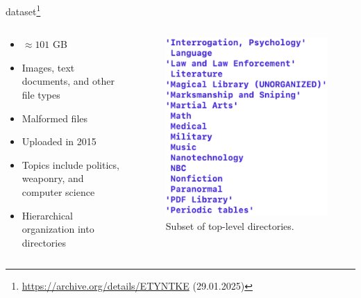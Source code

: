 \begin{frame}{\ac{dataset}\footnote{\url{https://archive.org/details/ETYNTKE} (29.01.2025)}}
    \begin{columns}[T] %
        \begin{column}{0.6\textwidth}
             \begin{itemize}
                \item<1-> $\approx 101$ GB 
                \item<1-> Images, text documents, and other file types
                \item<1-> Malformed files
                \item<2-> Uploaded in 2015
                \item<3-> Topics include politics, weaponry, and computer science
                \item<4-> Hierarchical organization into directories
            \end{itemize}
        \end{column}

        \begin{column}{0.25\textwidth}
            \begin{figure}
                \includegraphics[width=\linewidth]{images/screenshot_data.png}
                \caption{Subset of top-level directories.} %
            \end{figure}
   
        \end{column}
    \end{columns}
\end{frame}
